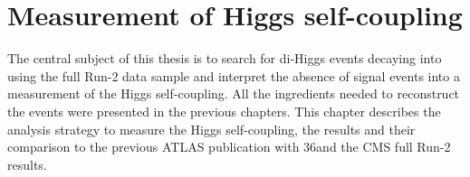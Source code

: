 \newpage
\chapter{Measurement of Higgs self-coupling}
\label{HHyybb}

The central subject of this thesis is to search for di-Higgs events decaying into \HHyybb using the full Run-2 data sample and interpret the absence of signal events into a measurement of the Higgs self-coupling. All the ingredients needed to reconstruct the \HHyybb events were presented in the previous chapters. This chapter describes the analysis strategy to measure the Higgs self-coupling, the results and their comparison to the previous ATLAS publication with 36\ifb and the CMS full Run-2 results.  

